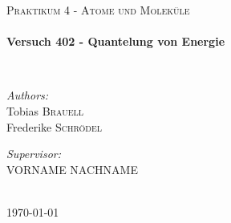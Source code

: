 \begin{titlepage}
\begin{center}
    \textsc{\Large Praktikum 4 - Atome und Moleküle}\\[0.5 cm]

    \HRule \\[0.4 cm]
    { \huge \bfseries Versuch 402 - Quantelung von Energie \\[0.4 cm] }

    \HRule \\[1.5 cm]

    \noindent
    \begin{minipage}{0.4\textwidth}
      \begin{flushleft} \large
	\emph{Authors:}\\
	Tobias \textsc{Brauell}\\
	Frederike \textsc{Schrödel}
      \end{flushleft}
    \end{minipage}%
    \begin{minipage}{0.4\textwidth}
      \begin{flushright} \large
	\emph{Supervisor:} \\
	VORNAME \textsc{NACHNAME}
      \end{flushright}
    \end{minipage}

    \vfill

    \HRule \\[0.4 cm]
    {\large \today}

  \end{center}
\end{titlepage}